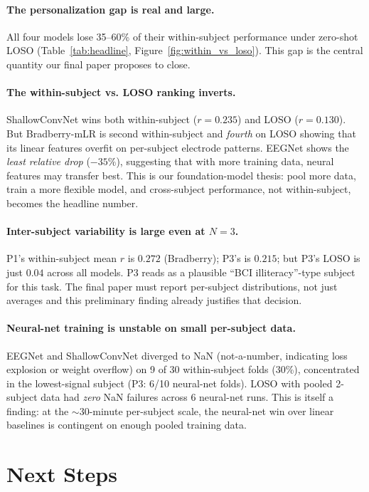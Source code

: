 \documentclass{article}
\begin{document}
\paragraph{The personalization gap is real and large.} All four models lose 35--60\% of their within-subject performance under zero-shot LOSO (Table~\ref{tab:headline}, Figure~\ref{fig:within_vs_loso}). This gap is the central quantity our final paper proposes to close.

\paragraph{The within-subject vs. LOSO ranking inverts.} ShallowConvNet wins both within-subject ($r = 0.235$) and LOSO ($r = 0.130$). But Bradberry-mLR is second within-subject and \emph{fourth} on LOSO showing that its linear features overfit on per-subject electrode patterns. EEGNet shows the \emph{least relative drop} ($-35\%$), suggesting that with more training data, neural features may transfer best. This is our foundation-model thesis: pool more data, train a more flexible model, and cross-subject performance, not within-subject, becomes the headline number.

\paragraph{Inter-subject variability is large even at $N = 3$.} P1's within-subject mean $r$ is $0.272$ (Bradberry); P3's is $0.215$; but P3's LOSO is just $0.04$ across all models. P3 reads as a plausible ``BCI illiteracy''-type subject for this task. The final paper must report per-subject distributions, not just averages and this preliminary finding already justifies that decision.

\paragraph{Neural-net training is unstable on small per-subject data.} EEGNet and ShallowConvNet diverged to NaN (not-a-number, indicating loss explosion or weight overflow) on 9 of 30 within-subject folds (30\%), concentrated in the lowest-signal subject (P3: 6/10 neural-net folds). LOSO with pooled 2-subject data had \emph{zero} NaN failures across 6 neural-net runs. This is itself a finding: at the $\sim$30-minute per-subject scale, the neural-net win over linear baselines is contingent on enough pooled training data.

\section{Next Steps}
\end{document}
